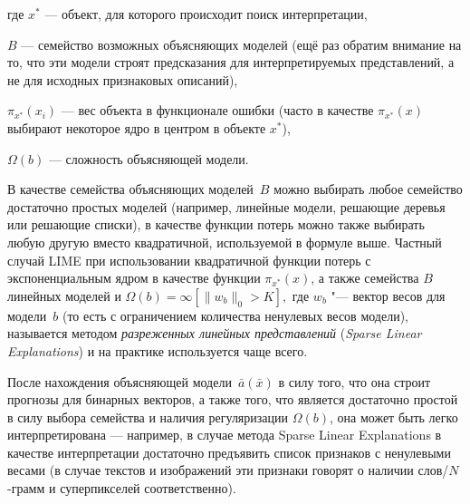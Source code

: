 \documentclass[12pt,a4paper]{article}
\begin{document}
	где $x^*$ — объект, для которого происходит поиск интерпретации, 
	\par $B$ — семейство возможных объясняющих моделей (ещё раз обратим внимание на то, что эти модели строят предсказания для интерпретируемых представлений, а не для исходных признаковых описаний), 
	\par $\pi_{x^*}(x_i)$ — вес объекта в функционале ошибки (часто в качестве $\pi_{x^*}(x)$ выбирают некоторое ядро в центром в объекте $x^*$), 
	\par $\Omega(b)$ — сложность объясняющей модели. 
	\par В качестве семейства объясняющих моделей~$B$ можно выбирать любое семейство достаточно простых моделей (например, линейные модели, решающие деревья или решающие списки), в качестве функции потерь можно также выбирать любую другую вместо квадратичной, используемой в формуле выше. Частный случай LIME при использовании квадратичной функции потерь с экспоненциальным ядром в качестве функции $\pi_{x^*}(x)$, а также семейства $B$ линейных моделей и $\Omega(b) = \infty [\| w_b\|_0 > K],$ где $w_b$ "--- вектор весов для модели~$b$ (то есть с ограничением количества ненулевых весов модели), называется методом \emph{разреженных линейных представлений} (\emph{Sparse Linear Explanations}) и на практике используется чаще всего.
	\par После нахождения объясняющей модели~$\bar{a}(\bar{x})$ в силу того, что она строит прогнозы для бинарных векторов, а также того, что является достаточно простой в силу выбора семейства и наличия регуляризации $\Omega(b)$, она может быть легко интерпретирована — например, в случае метода Sparse Linear Explanations в качестве интерпретации достаточно предъявить список признаков с ненулевыми весами (в случае текстов и изображений эти признаки говорят о наличии слов/$N$-грамм и суперпикселей соответственно).

%
%
%
\end{document}
